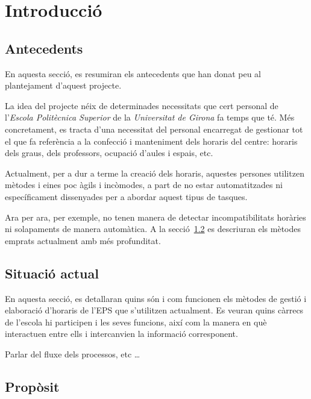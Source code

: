 \documentclass[a4paper,12pt]{ThesisStyle}
\begin{document}


\mainmatter

\chapter{Introducció}
\label{cap:intro}

\section{Antecedents}
\label{sec:antecedents}

En aquesta secció, es resumiran els antecedents que han donat peu al plantejament d'aquest projecte.

La idea del projecte néix de determinades necessitats que cert personal de l'\emph{Escola Politècnica Superior} de la \emph{Universitat de Girona} fa temps que
té. Més concretament, es tracta d'una necessitat del personal encarregat de gestionar tot el que fa referència a la confecció i manteniment dels horaris del
centre: horaris dels graus, dels professors, ocupació d'aules i espais, etc.

Actualment, per a dur a terme la creació dels horaris, aquestes persones utilitzen mètodes i eines poc àgils i incòmodes, a part de no estar automatitzades
ni específicament dissenyades per a abordar aquest tipus de tasques.

Ara per ara, per exemple, no tenen manera de detectar incompatibilitats horàries ni solapaments de manera automàtica. A la secció~\ref{sec:situacio_actual} es
descriuran els mètodes emprats actualment amb més profunditat.

\section{Situació actual}
\label{sec:situacio_actual}

En aquesta secció, es detallaran quins són i com funcionen els mètodes de gestió i elaboració d'horaris de l'EPS que s'utilitzen actualment. Es veuran quins càrrecs
de l'escola hi participen i les seves funcions, així com la manera en què interactuen entre ells i intercanvien la informació corresponent.

Parlar del fluxe dels processos, etc \ldots

\section{Propòsit}
\label{sec:proposit}
\end{document}
